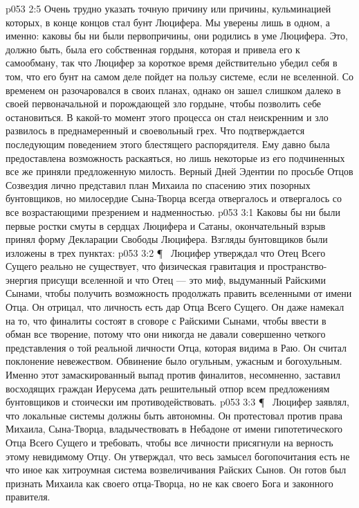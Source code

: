 \vs p053 2:5 Очень трудно указать точную причину или причины, кульминацией которых, в конце концов стал бунт Люцифера. Мы уверены лишь в одном, а именно: каковы бы ни были первопричины, они родились в уме Люцифера. Это, должно быть, была его собственная гордыня, которая и привела его к самообману, так что Люцифер за короткое время действительно убедил себя в том, что его бунт на самом деле пойдет на пользу системе, если не вселенной. Со временем он разочаровался в своих планах, однако он зашел слишком далеко в своей первоначальной и порождающей зло гордыне, чтобы позволить себе остановиться. В какой\hyp{}то момент этого процесса он стал неискренним и зло развилось в преднамеренный и своевольный грех. Что подтверждается последующим поведением этого блестящего распорядителя. Ему давно была предоставлена возможность раскаяться, но лишь некоторые из его подчиненных все же приняли предложенную милость. Верный Дней Эдентии по просьбе Отцов Созвездия лично представил план Михаила по спасению этих позорных бунтовщиков, но милосердие Сына\hyp{}Творца всегда отвергалось и отвергалось со все возрастающими презрением и надменностью.
\vs p053 3:1 Каковы бы ни были первые ростки смуты в сердцах Люцифера и Сатаны, окончательный взрыв принял форму Декларации Свободы Люцифера. Взгляды бунтовщиков были изложены в трех пунктах:
\vs p053 3:2 \P\ \bibnobreakspace {} Люцифер утверждал что Отец Всего Сущего реально не существует, что физическая гравитация и пространство\hyp{}энергия присущи вселенной и что Отец --- это миф, выдуманный Райскими Сынами, чтобы получить возможность продолжать править вселенными от имени Отца. Он отрицал, что личность есть дар Отца Всего Сущего. Он даже намекал на то, что финалиты состоят в сговоре с Райскими Сынами, чтобы ввести в обман все творение, потому что они никогда не давали совершенно четкого представления о той реальной личности Отца, которая видима в Раю. Он считал поклонение невежеством. Обвинение было огульным, ужасным и богохульным. Именно этот замаскированный выпад против финалитов, несомненно, заставил восходящих граждан Иерусема дать решительный отпор всем предложениям бунтовщиков и стоически им противодействовать.
\vs p053 3:3 \P\ \bibnobreakspace {} Люцифер заявлял, что локальные системы должны быть автономны. Он протестовал против права Михаила, Сына\hyp{}Творца, владычествовать в Небадоне от имени гипотетического Отца Всего Сущего и требовать, чтобы все личности присягнули на верность этому невидимому Отцу. Он утверждал, что весь замысел богопочитания есть не что иное как хитроумная система возвеличивания Райских Сынов. Он готов был признать Михаила как своего отца\hyp{}Творца, но не как своего Бога и законного правителя.
